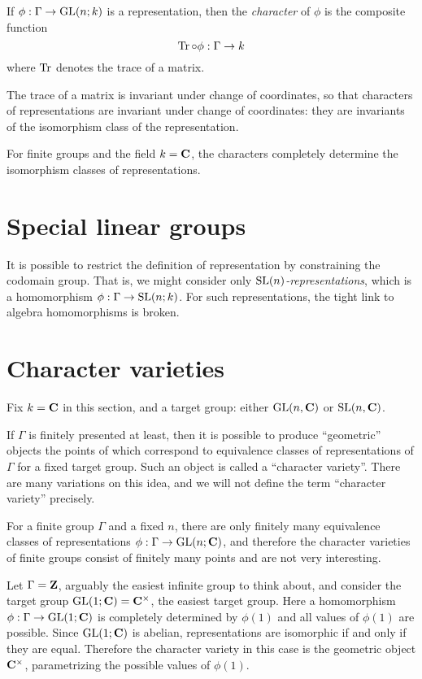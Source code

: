 \documentclass[11pt, oneside, usenames, dvipsnames, svgnames, table, draft]{amsart}
\begin{document}
\begin{definition}
  If $\phi : \Gamma \to \operatorname{GL}(n;k)$ is a representation, then the \emph{character} of $\phi$ is the composite function
  \[ \operatorname{Tr} \circ \phi : \Gamma \to k \]
  where $\operatorname{Tr}$ denotes the trace of a matrix.
\end{definition}

The trace of a matrix is invariant under change of coordinates, so that characters of representations are invariant
under change of coordinates: they are invariants of the isomorphism class of the representation.

For finite groups and the field $k=\mathbf{C}$, the characters completely determine the isomorphism classes of representations.

\section{Special linear groups}
\label{sec:spec-line-groups}

It is possible to restrict the definition of representation by constraining the codomain group. That is, we might
consider only \emph{$\operatorname{SL}(n)$-representations}, which is a homomorphism $\phi: \Gamma \to \operatorname{SL}(n; k)$. For such
representations, the tight link to algebra homomorphisms is broken.

\section{Character varieties}
\label{sec:character-varieties}

Fix $k = \mathbf{C}$ in this section, and a target group: either $\operatorname{GL}(n, \mathbf{C})$ or $\operatorname{SL}(n, \mathbf{C})$.

If $\Gamma$ is finitely presented at least, then it is possible to produce ``geometric'' objects the points of which
correspond to equivalence classes of representations of $\Gamma$ for a fixed target group. Such an object is called a
``character variety''. There are many variations on this idea, and we will not define the term ``character variety''
precisely.


\begin{example}
  For a finite group $\Gamma$ and a fixed $n$, there are only finitely many equivalence classes of representations
  $\phi: \Gamma \to \operatorname{GL}(n; \mathbf{C})$, and therefore the character varieties of finite groups consist of finitely many points
  and are not very interesting.
\end{example}

\begin{example}
  Let $\Gamma = \mathbf{Z}$, arguably the easiest infinite group to think about, and consider the target group $\operatorname{GL}(1; \mathbf{C}) =
  \mathbf{C}^\times$, the easiest target group. Here a homomorphism $\phi : \Gamma \to \operatorname{GL}(1; \mathbf{C})$ is completely determined by
  $\phi(1)$ and all values of $\phi(1)$ are possible. Since $\operatorname{GL}(1; \mathbf{C})$ is abelian, representations are isomorphic if
  and only if they are equal. Therefore the character variety in this case is the geometric object $\mathbf{C}^\times$,
  parametrizing the possible values of $\phi(1)$.
\end{example}
\end{document}
